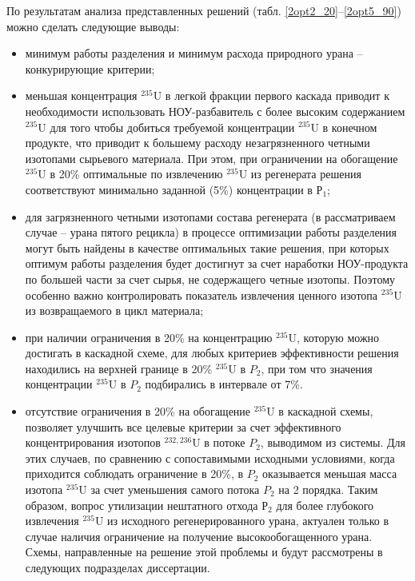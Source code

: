 По результатам анализа представленных решений (табл. \ref{2opt2_20}--\ref{2opt5_90}) можно сделать следующие выводы:
\begin{itemize}
    \item минимум работы разделения и минимум расхода природного урана -- конкурирующие критерии;
    \item меньшая концентрация $^{235}$U в легкой фракции первого каскада приводит к необходимости использовать НОУ-разбавитель с более высоким содержанием $^{235}$U для того чтобы добиться требуемой концентрации $^{235}$U в конечном продукте, что приводит к большему расходу незагрязненного четными изотопами сырьевого материала. При этом, при ограничении на обогащение $^{235}$U в 20\% оптимальные по извлечению $^{235}$U из регенерата решения соответствуют минимально заданной (5\%) концентрации в $Р_1$;
    \item для загрязненного четными изотопами состава регенерата (в рассматриваем случае -- урана пятого рецикла) в процессе оптимизации работы разделения могут быть найдены в качестве оптимальных такие решения, при которых оптимум работы разделения будет достигнут за счет наработки НОУ-продукта по большей части за счет сырья, не содержащего четные изотопы. Поэтому особенно важно контролировать показатель извлечения ценного изотопа $^{235}$U из возвращаемого в цикл материала;
    \item при наличии ограничения в 20\% на концентрацию $^{235}$U, которую можно достигать в каскадной схеме, для любых критериев эффективности решения находились на верхней границе в 20\% $^{235}$U в $P_2$, при том что значения концентрации $^{235}$U в $P_2$ подбирались в интервале от 7\%.
    \item отсутствие ограничения в 20\% на обогащение $^{235}$U в каскадной схемы, позволяет улучшить все целевые критерии за счет эффективного концентрирования изотопов $^{232,236}$U в потоке $P_2$, выводимом из системы. Для этих случаев, по сравнению с сопоставимыми исходными условиями, когда приходится соблюдать ограничение в 20\%, в $P_2$ оказывается меньшая масса изотопа $^{235}$U за счет уменьшения самого потока $P_2$ на 2 порядка. Таким образом, вопрос утилизации нештатного отхода $Р_2$ для более глубокого извлечения $^{235}$U из исходного регенерированного урана, актуален только в случае наличия ограничение на получение высокообогащенного урана. Схемы, направленные на решение этой проблемы и будут рассмотрены в следующих подразделах диссертации.
\end{itemize}


